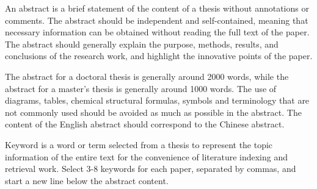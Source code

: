 

\begin{abstract}
  摘要是学位论文的内容不加注释和评论的简要陈述。
  摘要应具有独立性和自含性，即不阅读论文的全文，就能获得必要的信息。
  摘要一般应说明研究工作的目的、方法、结果和结论等，
  应突出论文的创新点。
  
  博士学位论文的摘要一般2000字左右，硕士学位论文的摘要一般1000字左右。
  摘要中应尽量避免采用图、表、化学结构式、非公知公用的符号和术语。
  英文摘要的内容应与中文摘要相对应。

  关键词是为了便于文献索引和检索工作，
  从学位论文中选取出来用以表示全文主题内容信息的单词或术语。
  每篇论文选取3－8个关键词，每个关键词之间用逗号间隔，另起一行，排在摘要内容下方。

\end{abstract}

\begin{abstract*}
An abstract is a brief statement of the content of a thesis without annotations or comments. The abstract should be independent and self-contained, meaning that necessary information can be obtained without reading the full text of the paper. The abstract should generally explain the purpose, methods, results, and conclusions of the research work, and highlight the innovative points of the paper.

The abstract for a doctoral thesis is generally around 2000 words, while the abstract for a master's thesis is generally around 1000 words. The use of diagrams, tables, chemical structural formulas, symbols and terminology that are not commonly used should be avoided as much as possible in the abstract. The content of the English abstract should correspond to the Chinese abstract.

Keyword is a word or term selected from a thesis to represent the topic information of the entire text for the convenience of literature indexing and retrieval work. Select 3-8 keywords for each paper, separated by commas, and start a new line below the abstract content.

\end{abstract*}
